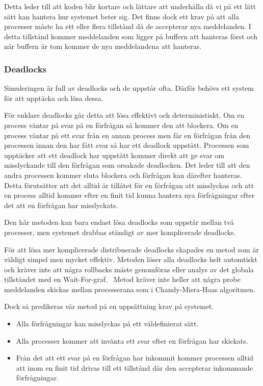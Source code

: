 \documentclass[12pt]{article}
\begin{document}
Detta leder till att koden blir kortare och lättare att underhålla då vi på ett lätt sätt kan hantera hur systemet beter sig.
Det finns dock ett krav på att alla processer måste ha ett eller flera tillstånd då de accepterar nya meddelanden.
I detta tillstånd kommer meddelanden som ligger på buffern att hanteras först och när buffern är tom kommer de nya meddelandena att hanteras.

\subsubsection{Deadlocks}
Simuleringen är full av deadlocks och de uppstår ofta.
Därför behövs ett system för att upptäcka och lösa dessa.

För enklare deadlocks går detta att lösa effektivt och deterministiskt.
Om en process väntar på svar på en förfrågan så kommer den att blockera.
Om en process väntar på ett svar från en annan process men får en förfrågan från den processen innan den har fått svar så har ett deadlock uppstått.
Processen som upptäcker att ett deadlock har uppstått kommer direkt att ge svar om misslyckande till den förfrågan som orsakade deadlocken.
Det leder till att den andra processen kommer sluta blockera och förfrågan kan därefter hanteras.
Detta förutsätter att det alltid är tillåtet för en förfrågan att misslyckas och att en process alltid kommer efter en finit tid kunna hantera nya förfrågningar efter det att en förfrågan har misslyckats.

Den här metoden kan bara endast lösa deadlocks som uppstår mellan två processer,
men systemet drabbas ständigt av mer komplicerade deadlocks.

För att lösa mer komplicerade distribuerade deadlocks skapades en metod som är väldigt simpel men mycket effektiv.
Metoden löser alla deadlocks helt automtiskt och kräver inte att några rollbacks måste genomföras eller analys av det globala tillståndet med en Wait-For-graf.~\cite{krzyzanowski-ddeadlock}
Metod kräver inte heller att några probe meddelanden skickas mellan processerana som i Chandy-Misra-Haas algoritmen.~\cite{chandy1983distributed}

Dock så predikeras vår metod på en uppsättning krav på systemet.

\begin{itemize}
    \item Alla förfrågningar kan misslyckas på ett väldefinierat sätt.
    \item Alla processer kommer att invänta ett svar efter en förfrågan har skickats.
    \item Från det att ett svar på en förfrågan har inkommit kommer processen alltid att inom en finit tid drivas till ett tillstånd där den accepterar inkommande förfrågningar.
\end{itemize}
\end{document}
